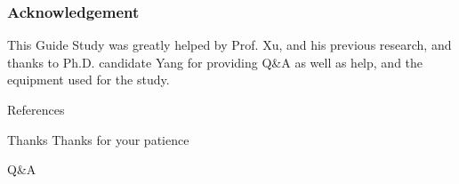 \documentclass{beamer}
\begin{document}
\appendix
\begin{frame}
  \frametitle{Acknowledgement}
  This Guide Study was greatly helped by Prof. Xu, and his previous research, and thanks to Ph.D. candidate Yang for providing Q\&A as well as help, and the equipment used for the study.
\end{frame}

\begin{frame}[allowframebreaks]{References} 
\fontsize{7pt}{7pt}\selectfont
\end{frame}

\begin{frame}{Thanks} 
  \fontsize{23pt}{23pt}\selectfont
  \centering
  Thanks for your patience

  \vspace{0.2in}
  
  Q\&A
\end{frame}
\end{document}
